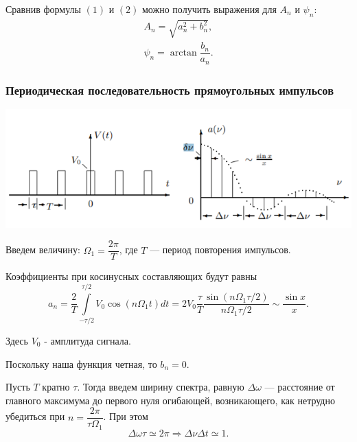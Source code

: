 \documentclass[12pt,a4paper]{article}
\begin{document}
Сравнив формулы $(1)$ и $(2)$ можно получить выражения для $A_n$  и $\psi_n$:
\begin{equation}
\begin{array}{l}
A_n = \sqrt{a_n^2+b_n^2},\\
 \psi_n = \arctan \dfrac{b_n}{a_n}.
\end{array}
\end{equation}

\subsubsection*{Периодическая последовательность прямоугольных импульсов}
\begin{center}
\includegraphics[scale=0.9]{s1.png}
\end{center}
Введем величину: $\Omega_1 = \dfrac{2\pi}{T}$,
где $T$ --- период повторения импульсов.

Коэффициенты при косинусных составляющих будут равны
\begin{equation}
a_n = \dfrac{2}{T}\int\limits_{-\tau/2}^{\tau/2}V_0\cos\left(n\Omega_1 t\right)dt = 2V_0\dfrac{\tau}{T}\dfrac{\sin\left(n\Omega_1\tau/2\right)}{n\Omega_1\tau/2} \sim \dfrac{\sin x}{x}.
\end{equation}

Здесь $V_0$ - амплитуда сигнала.

Поскольку наша функция четная, то $b_n = 0$. 

Пусть $T$ кратно $\tau$. Тогда введем ширину спектра, равную $\Delta \omega$ --- расстояние от главного максимума до первого нуля огибающей, возникающего, как нетрудно убедиться при $n = \dfrac{2\pi}{\tau \Omega_1}$. При 
этом
\begin{equation}
\Delta \omega \tau \simeq 2\pi \Rightarrow \Delta \nu \Delta t \simeq 1.
\end{equation}
\end{document}
